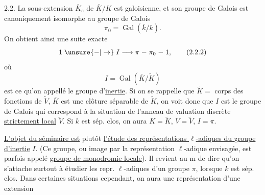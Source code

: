 2.2. La sous-extension \(\overline K_e\) de \(\overline K/K\) est galoisienne, et son groupe de Galois est canoniquement isomorphe au groupe de Galois
\[
\pi_0=\operatorname{Gal}(\bar k/k).\tag*{(2.2.1)}
\]
On obtient ainsi une suite exacte
\[
1\mathrel{\unsure{-|\to}} I\longrightarrow\pi\mathrel{-}\pi_0\mathrel{-}1,\tag*{(2.2.2)}
\]
où
\[
I=\operatorname{Gal}(\overline K/\widetilde K)
\]
est ce qu'on appellé le groupe d'\uline{inertie}.   Si on se rappelle que \(\widetilde K=\) corps des fonctions de \(\widetilde V\),  \(\overline K\) est une clôture séparable de \(\widetilde K\), on voit donc que \(I\) est le groupe de Galois qui correspond à la situation  de l'anneau de valuation discrète \uline{strictement local} \(\widetilde V\). Si \(k\) est sép. clos, on aura \(K=\widetilde K\), \(V=\widetilde V\), \(I=\pi\).

\uline{L'objet du séminaire est} plutôt \uline{l'étude des représentations \(\ell\)-adiques du groupe d'inertie} \(I\). (Ce groupe, ou  image par la représentation \(\ell\)-adique envisagée,  est parfois appelé \uline{groupe de monodromie locale}). Il revient au \(\overline{\mathrm m}\) de dire qu'on s'attache surtout à étudier les repr. \(\ell\)-adiques d'un groupe \(\pi\), lorsque \(k\) est sép. clos. Dans certaines situations cependant, on aura une représentation d'une extension
